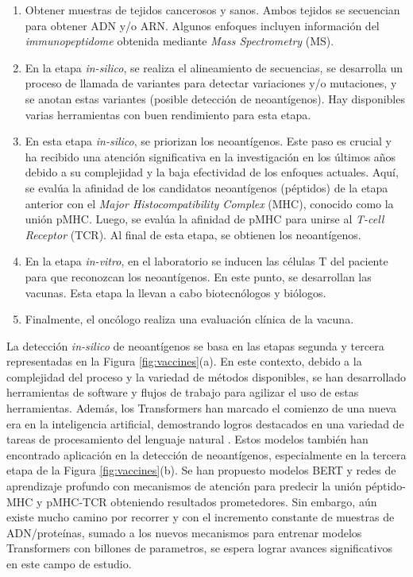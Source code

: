 \begin{enumerate}
	\item Obtener muestras de tejidos cancerosos y sanos. Ambos tejidos se secuencian para obtener ADN y/o ARN. Algunos enfoques incluyen información del \textit{immunopeptidome} obtenida mediante \textit{Mass Spectrometry} (MS).
	\item En la etapa \textit{in-silico}, se realiza el alineamiento de secuencias, se desarrolla un proceso de llamada de variantes para detectar variaciones y/o mutaciones, y se anotan estas variantes (posible detección de neoantígenos). Hay disponibles varias herramientas con buen rendimiento para esta etapa.
	\item En esta etapa \textit{in-silico}, se priorizan los neoantígenos. Este paso es crucial y ha recibido una atención significativa en la investigación en los últimos años debido a su complejidad y la baja efectividad de los enfoques actuales. Aquí, se evalúa la afinidad de los candidatos neoantígenos (péptidos) de la etapa anterior con el \textit{Major Histocompatibility Complex} (MHC), conocido como la unión pMHC. Luego, se evalúa la afinidad de pMHC para unirse al \textit{T-cell Receptor} (TCR). Al final de esta etapa, se obtienen los neoantígenos.
	\item En la etapa \textit{in-vitro}, en el laboratorio se inducen las células T del paciente para que reconozcan los neoantígenos. En este punto, se desarrollan las vacunas. Esta etapa la llevan a cabo biotecnólogos y biólogos.
	\item Finalmente, el oncólogo realiza una evaluación clínica de la vacuna.
	
\end{enumerate}

La detección \textit{in-silico} de neoantígenos se basa en las etapas segunda y tercera representadas en la Figura \ref{fig:vaccines}(a). En este contexto, debido a la complejidad del proceso y la variedad de métodos disponibles, se han desarrollado herramientas de software y flujos de trabajo para agilizar el uso de estas herramientas. Además, los Transformers han marcado el comienzo de una nueva era en la inteligencia artificial, demostrando logros destacados en una variedad de tareas de procesamiento del lenguaje natural  \citep{patwardhan2023transformers}. Estos modelos también han encontrado aplicación en la detección de neoantígenos, especialmente en la tercera etapa de la Figura \ref{fig:vaccines}(b). Se han propuesto modelos BERT y redes de aprendizaje profundo con mecanismos de atención para predecir la unión péptido-MHC y pMHC-TCR obteniendo resultados prometedores. Sin embargo, aún existe mucho camino por recorrer y con el incremento constante de muestras de ADN/proteínas, sumado a los nuevos mecanismos para entrenar modelos Transformers con billones de parametros, se espera lograr avances significativos en este campo de estudio.


